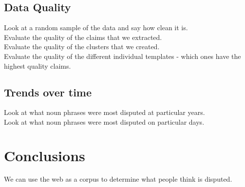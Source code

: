 \documentclass{www2010-submission}
\newcommand{\todo}[1]{}
\newcommand{\x}[1]{{\color{blue} #1}\\}
\begin{document}
\subsection{Data Quality}

\x{Look at a random sample of the data and say how clean it is.}
\x{Evaluate the quality of the claims that we extracted.}
\x{Evaluate the quality of the clusters that we created.}
\x{Evaluate the quality of the different individual templates - which ones have the highest quality claims.}

\subsection{Trends over time}

\x{Look at what noun phrases were most disputed at particular years.}
\x{Look at what noun phrases were most disputed on particular days.}


\section{Conclusions}

\x{We can use the web as a corpus to determine what people think is disputed.}



\todo{Do we want to have acknowledgements}


\end{document}

